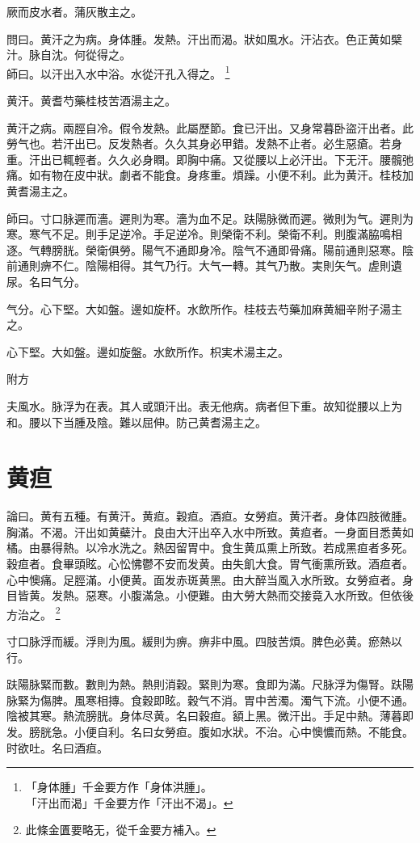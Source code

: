 \documentclass[12pt,twoside,UTF8,b5paper]{ctexbook}
\begin{document}
厥而皮水者。蒲灰散主之。

問曰。黄汗之为病。身体腫。发熱。汗出而渴。狀如風水。汗沾衣。色正黄如檗汁。脉自沈。何從得之。\\
師曰。以汗出入水中浴。水從汗孔入得之。
	\footnote{「身体腫」千金要方作「身体洪腫」。\\「汗出而渴」千金要方作「汗出不渴」。}

黄汗。黄耆芍藥桂枝苦酒湯主之。

黄汗之病。兩脛自冷。假令发熱。此屬歷節。食已汗出。又身常暮{卧}盜汗出者。此勞气也。若汗出已。反发熱者。久久其身必甲錯。发熱不止者。必生惡瘡。若身重。汗出已輒輕者。久久必身瞤。即胸中痛。又從腰以上必汗出。下无汗。腰髖弛痛。如有物在皮中狀。劇者不能食。身疼重。煩躁。小便不利。此为黄汗。桂枝加黄耆湯主之。

師曰。寸口脉遲而濇。遲則为寒。濇为血不足。趺陽脉微而遲。微則为气。遲則为寒。寒气不足。則手足逆冷。手足逆冷。則榮衛不利。榮衛不利。則腹滿脇鳴相逐。气轉膀胱。榮衛俱勞。陽气不通即身冷。陰气不通即骨痛。陽前通則惡寒。陰前通則痹不仁。陰陽相得。其气乃行。大气一轉。其气乃散。実則矢气。虗則遺尿。名曰气分。

气分。心下堅。大如盤。邊如旋杯。水飲所作。桂枝去芍藥加麻{黄細}辛附子湯主之。

心下堅。大如盤。邊如旋盤。水飲所作。枳{実}术湯主之。

附方

夫風水。脉浮为在表。其人或頭汗出。表无他病。病者但下重。故知從腰以上为和。腰以下当腫及陰。難以屈伸。防己黄耆湯主之。

\chapter{黄疸}

論曰。黄有五種。有黄汗。黄疸。穀疸。酒疸。女勞疸。黄汗者。身体四肢微腫。胸滿。不渴。汗出如黄蘗汁。良由大汗出卒入水中所致。黄疸者。一身面目悉黄如橘。由暴得熱。以冷水洗之。熱因留胃中。食生黄瓜熏上所致。若成黑疸者多死。穀疸者。食畢頭眩。心忪怫鬱不安而发黄。由失飢大食。胃气衝熏所致。酒疸者。心中懊痛。足脛滿。小便黄。面发赤斑黄黑。由大醉当風入水所致。女勞疸者。身目皆黄。发熱。惡寒。小腹滿急。小便難。由大勞大熱而交接竟入水所致。但依後方治之。
	\footnote{此條金匱要略无，從千金要方補入。}

寸口脉浮而緩。浮則为風。緩則为痹。痹非中風。四肢苦煩。脾色必黄。瘀熱以行。

趺陽脉緊而數。數則为熱。熱則消穀。緊則为寒。食即为滿。尺脉浮为傷腎。趺陽脉緊为傷脾。風寒相摶。食穀即眩。穀气不消。胃中苦濁。濁气下流。小便不通。陰被其寒。熱流膀胱。身体尽黄。名曰穀疸。額上黑。微汗出。手足中熱。薄暮即发。膀胱急。小便自利。名曰女勞疸。腹如水狀。不治。心中懊憹而熱。不能食。时欲吐。名曰酒疸。
\end{document}
